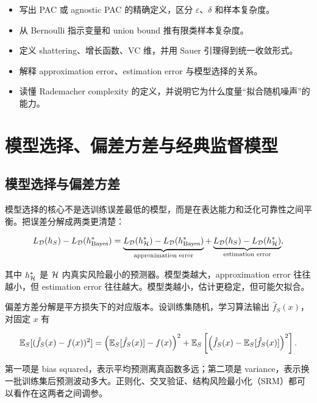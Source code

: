 \begin{itemize}
  \item 写出 PAC 或 agnostic PAC 的精确定义，区分 \(\varepsilon\)、\(\delta\) 和样本复杂度。
  \item 从 Bernoulli 指示变量和 union bound 推有限类样本复杂度。
  \item 定义 shattering、增长函数、VC 维，并用 Sauer 引理得到统一收敛形式。
  \item 解释 approximation error、estimation error 与模型选择的关系。
  \item 读懂 Rademacher complexity 的定义，并说明它为什么度量“拟合随机噪声”的能力。
\end{itemize}

\section{模型选择、偏差方差与经典监督模型}


\subsection{模型选择与偏差方差}


模型选择的核心不是选训练误差最低的模型，而是在表达能力和泛化可靠性之间平衡。把误差分解成两类更清楚：

\[
  L_{\mathcal{D}}(h_S)-L_{\mathcal{D}}(h^*_{\mathrm{Bayes}})
  =
  \underbrace{
    L_{\mathcal{D}}(h^*_{\mathcal{H}})-L_{\mathcal{D}}(h^*_{\mathrm{Bayes}})
  }_{\text{approximation error}}
  +
  \underbrace{
    L_{\mathcal{D}}(h_S)-L_{\mathcal{D}}(h^*_{\mathcal{H}})
  }_{\text{estimation error}},
\]

其中 \(h^*_{\mathcal{H}}\) 是 \(\mathcal{H}\) 内真实风险最小的预测器。模型类越大，approximation error 往往越小，但 estimation error 往往越大。模型类越小，估计更稳定，但可能欠拟合。

偏差方差分解是平方损失下的对应版本。设训练集随机，学习算法输出 \(\hat f_S(x)\)，对固定 \(x\) 有

\[
  \mathbb{E}_S[(\hat f_S(x)-f(x))^2]
  =
  \left(\mathbb{E}_S[\hat f_S(x)]-f(x)\right)^2
  +
  \mathbb{E}_S\left[
    \left(\hat f_S(x)-\mathbb{E}_S[\hat f_S(x)]\right)^2
  \right].
\]

第一项是 bias squared，表示平均预测离真函数多远；第二项是 variance，表示换一批训练集后预测波动多大。正则化、交叉验证、结构风险最小化（SRM）都可以看作在这两者之间调参。

